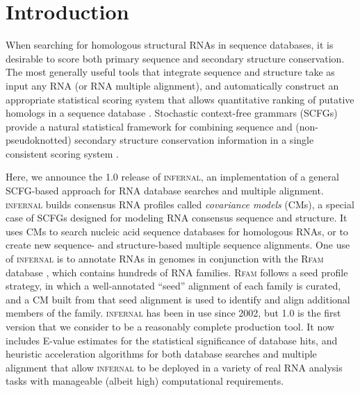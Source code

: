 \section{Introduction}

When searching for homologous structural RNAs in sequence databases,
it is desirable to score both primary sequence and secondary structure
conservation.  The most generally useful tools that integrate sequence
and structure take as input any RNA (or RNA multiple alignment), and
automatically construct an appropriate statistical scoring system that
allows quantitative ranking of putative homologs in a sequence
database \citep{Gautheret01,ZhangBafna05,Huang08}.  Stochastic
context-free grammars (SCFGs) provide a natural statistical framework
for combining sequence and (non-pseudoknotted) secondary structure
conservation information in a single consistent scoring system
\citep{Sakakibara94c,Eddy94,Brown00,Durbin98}.

Here, we announce the 1.0 release of \textsc{infernal}, an
implementation of a general SCFG-based approach for RNA database
searches and multiple alignment. \textsc{infernal} builds consensus
RNA profiles called \emph{covariance models} (CMs), a special case of
SCFGs designed for modeling RNA consensus sequence and structure. It
uses CMs to search nucleic acid sequence databases for homologous
RNAs, or to create new sequence- and structure-based multiple
sequence alignments. One use of \textsc{infernal} is to annotate RNAs
in genomes in conjunction with the \textsc{Rfam} database
\citep{Gardner09}, which contains hundreds of RNA families.
\textsc{Rfam} follows a seed profile strategy, in which a
well-annotated ``seed'' alignment of each family is curated, and a CM
built from that seed alignment is used to identify and align
additional members of the family.  \textsc{infernal} has been in use
since 2002, but 1.0 is the first version that we consider to be a
reasonably complete production tool. It now includes E-value estimates
for the statistical significance of database hits, and heuristic
acceleration algorithms for both database searches and multiple
alignment that allow \textsc{infernal} to be deployed in a variety of
real RNA analysis tasks with manageable (albeit high) computational
requirements.

